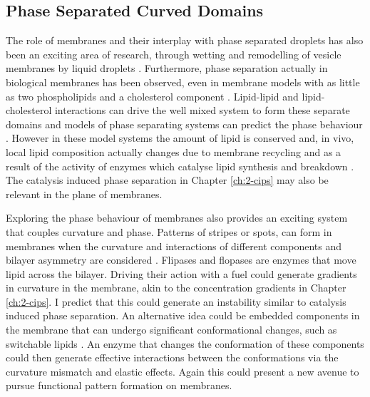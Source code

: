 \subsection{Phase Separated Curved Domains}

The role of membranes and their interplay with phase separated droplets has also been an exciting area of research, through wetting and remodelling of vesicle membranes by liquid droplets \cite{mangiarotti_wetting_2023}. Furthermore, phase separation actually in biological membranes has been observed, even in membrane models with as little as two phospholipids and a cholesterol component \cite{elson_phase_2010}. Lipid-lipid and lipid-cholesterol interactions can drive the well mixed system to form these separate domains \cite{feigenson_phase_2009} and models of phase separating systems can predict the phase behaviour \cite{wolff_thermodynamic_2011}. However in these model systems the amount of lipid is conserved and, in vivo, local lipid composition actually changes due to membrane recycling and as a result of the activity of enzymes which catalyse lipid synthesis and breakdown \cite{feigenson_phase_2009}. The catalysis induced phase separation in Chapter \ref{ch:2-cips} may also be relevant in the plane of membranes.

Exploring the phase behaviour of membranes also provides an exciting system that couples curvature and phase. Patterns of stripes or spots, can form in membranes when the curvature and interactions of different components and bilayer asymmetry are considered \cite{yu_pattern_2023}. Flipases and flopases are enzymes that move lipid across the bilayer. \cite{alberts_molecular_2008} Driving their action with a fuel could generate gradients in curvature in the membrane, akin to the concentration gradients in Chapter \ref{ch:2-cips}. I predict that this could generate an instability similar to catalysis induced phase separation. An alternative idea could be embedded components in the membrane that can undergo significant conformational changes, such as switchable lipids \cite{phan_switchable_2023}. An enzyme that changes the conformation of these components could then generate effective interactions between the conformations via the curvature mismatch and elastic effects. Again this could present a new avenue to pursue functional pattern formation on membranes.

